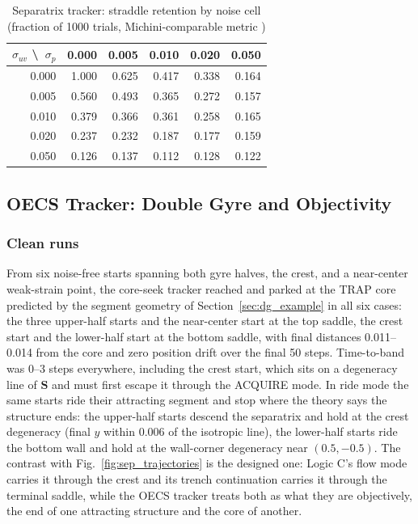 \documentclass[lettersize,journal]{IEEEtran}
\begin{document}
\begin{table}[!t]
\centering
\caption{Separatrix tracker: straddle retention by noise cell (fraction
of 1000 trials, Michini-comparable metric \cite{9})}
\label{tab:sep_straddle}
\footnotesize
\setlength{\tabcolsep}{4pt}
\begin{tabular}{r|rrrrr}
\hline
$\sigma_{uv}$ \textbackslash\ $\sigma_p$ & 0.000 & 0.005 & 0.010 & 0.020 & 0.050 \\
\hline
0.000 & 1.000 & 0.625 & 0.417 & 0.338 & 0.164 \\
0.005 & 0.560 & 0.493 & 0.365 & 0.272 & 0.157 \\
0.010 & 0.379 & 0.366 & 0.361 & 0.258 & 0.165 \\
0.020 & 0.237 & 0.232 & 0.187 & 0.177 & 0.159 \\
0.050 & 0.126 & 0.137 & 0.112 & 0.128 & 0.122 \\
\hline
\end{tabular}
\end{table}

\subsection{OECS Tracker: Double Gyre and Objectivity}
\label{sec:results_oecs}


\subsubsection{Clean runs}
From six noise-free starts spanning both gyre halves, the crest, and a
near-center weak-strain point, the core-seek tracker reached and parked
at the TRAP core predicted by the segment geometry of
Section~\ref{sec:dg_example} in all six cases: the three upper-half
starts and the near-center start at the top saddle, the crest start and
the lower-half start at the bottom saddle, with final distances
0.011--0.014 from the core and zero position drift over the final 50
steps. Time-to-band was 0--3 steps everywhere, including the crest
start, which sits on a degeneracy line of $\mathbf{S}$ and must first
escape it through the ACQUIRE mode. In ride mode the same starts ride
their attracting segment and stop where the theory says the structure
ends: the upper-half starts descend the separatrix and hold at the
crest degeneracy (final $y$ within 0.006 of the isotropic line), the
lower-half starts ride the bottom wall and hold at the wall-corner
degeneracy near $(0.5, -0.5)$. The contrast with
Fig.~\ref{fig:sep_trajectories} is the designed one: Logic C's flow
mode carries it through the crest and its trench continuation carries
it through the terminal saddle, while the OECS tracker treats both as
what they are objectively, the end of one attracting structure and the
core of another.
\end{document}
